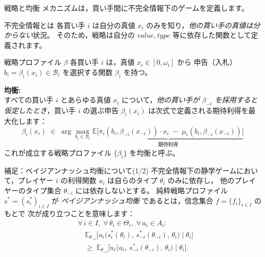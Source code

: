 \documentclass[dvipdfmx,autodetect-engine]{beamer}
\begin{document}
\begin{frame}{戦略と均衡}
  \tiny\setlength{\parskip}{0pt}\setlength{\topsep}{0pt}
  \vspace{-1ex}
  メカニズムは，買い手間に不完全情報下のゲームを定義します。
  \begin{block}{不完全情報とは}
    各買い手 $i$ は自分の真値 $x_i$ のみを知り，\emph{他の買い手の真値は分からない}状況。
    そのため，戦略は自分の $value, type$ 等に依存した関数として定義されます。
  \end{block}

  \vspace{1ex}
  \begin{block}{戦略プロファイル $\beta$}
    各買い手 $i$ は，真値 $x_i\in[0,\omega_i]$ から
    申告（入札）$b_i=\beta_i(x_i)\in\mathcal B_i$ を選択する関数 $\beta_i$ を持つ。
  \end{block}

  \vspace{1ex}
  \textbf{均衡:}\\
  すべての買い手 $i$ とあらゆる真値 $x_i$ について，\emph{他の買い手が
  $\beta_{-i}$ を採用すると仮定したとき}，買い手 $i$ の選ぶ申告
  \(\beta_i(x_i)\) は次式で定義される期待利得を最大化します：
  \[
    \beta_i(x_i)
    \;\in\;
    \arg\max_{b_i\in\mathcal{B}_i}
    \underbrace{\mathbb{E}\bigl[\pi_i(b_i,\beta_{-i}(x_{-i}))\cdot x_i
    \;-\;\mu_i(b_i,\beta_{-i}(x_{-i}))\bigr]}_{\text{期待利得}}
  \]
  これが成立する戦略プロファイル $\{\beta_i\}$ を均衡と呼ぶ。
\end{frame}

\begin{frame}{補足：ベイジアンナッシュ均衡について(1/2)}
  不完全情報下の静学ゲームにおいて，プレイヤー \(i\) の利得関数 \(u_i\) は自らのタイプ \(\theta_i\) のみに依存し，
  他のプレイヤーのタイプ集合 \(\theta_{-i}\) には依存しないとする。
  純粋戦略プロファイル \(s^* = (s^*_i)_{i\in I}\) が
  \emph{ベイジアンナッシュ均衡} であるとは，信念集合 \(f = \{f_i\}_{i\in I}\) のもとで
  次が成り立つことを意味します：
  \begin{equation*}
    \begin{aligned}
      &\forall\,i\in I,\;\forall\,\theta_i\in\Theta_i,\;\forall\,a_i\in A_i: \\[-0.5ex]
      &\quad\mathbb{E}_{\theta_{-i}}\bigl[
        u_i\bigl(s^*_i(\theta_i),\,s^*_{-i}(\theta_{-i}),\,\theta_i\bigr)
        \mid \theta_i
      \bigr] \\
      &\quad\ge\;
      \mathbb{E}_{\theta_{-i}}\bigl[
        u_i\bigl(a_i,\,s^*_{-i}(\theta_{-i}),\,\theta_i\bigr)
        \mid \theta_i
      \bigr].
    \end{aligned}
  \end{equation*}
\end{frame}
\end{document}
